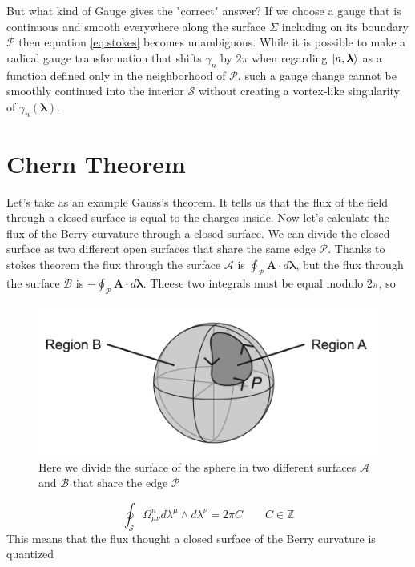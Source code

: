     But what kind of Gauge gives the "correct" answer? If we choose a gauge that is continuous and smooth
    everywhere along the surface $\Sigma$ including on its boundary $\mathcal P$ then equation \ref{eq:stokes} becomes unambiguous.\newline
    While it is possible to make a radical gauge transformation that shifts $\gamma_n$ by $2\pi$ when regarding $\ket{n,\boldsymbol \lambda}$ as a function defined only in the neighborhood of $\mathcal P$, such a gauge change cannot be smoothly continued into the interior $\mathcal S$ without creating a vortex-like singularity of $\gamma_n(\boldsymbol \lambda)$.


\section{Chern Theorem}
    
    Let's take as an example Gauss's theorem. It tells us that the flux of the field through a closed surface is equal to the charges inside. \newline
    Now let's calculate the flux of the Berry curvature through a closed surface. We can divide the closed surface as two different open surfaces that share the same edge $\mathcal P$.\newline
    Thanks to stokes theorem the flux through the surface $\mathcal A$ is $\oint_\mathcal{P} \mathbf A \cdot d\boldsymbol \lambda$, but the flux through the surface $\mathcal B$ is $-\oint_\mathcal{P} \mathbf A \cdot d\boldsymbol \lambda$.\newline
    Theese two integrals must be equal modulo $2\pi$, so
    \begin{figure}
        \centering
        \includegraphics[width=0.85\linewidth]{../website/images/berry/chern_theorem.png}
        \caption{Here we divide the surface of the sphere in two different surfaces $\mathcal A$ and $\mathcal B$ that share the edge $\mathcal P$}
        \label{fig:forward_pass}
    \end{figure}
    \begin{equation}
        \label{eq:chern}
        \oint_\mathcal{S} \Omega_{\mu\nu}^n d\lambda^\mu \wedge d\lambda^\nu =2\pi C \quad\quad C\in \mathbb Z
    \end{equation}
    This means that the flux thought a closed surface of the Berry curvature is quantized
    
